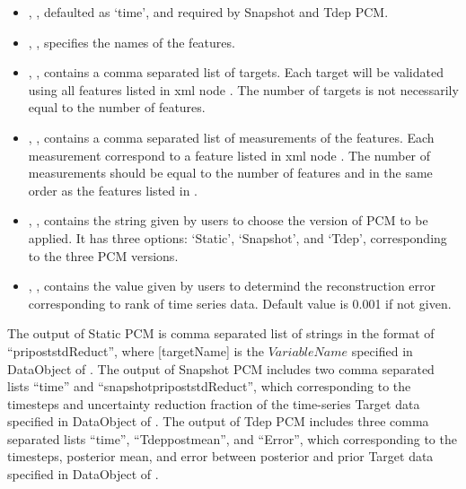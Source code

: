 \begin{itemize}
  \item {}, , defaulted as `time', and required by Snapshot and Tdep PCM.
  \item {}, , specifies the names of the features.
  \item {}, , contains a comma separated list of
     targets. \nb Each target will be validated using all features listed in xml node . The
    number of targets is not necessarily equal to the number of features.
  \item {}, , contains a comma separated list of
     measurements of the features. \nb Each measurement correspond to a feature listed in xml node . The
    number of measurements should be equal to the number of features and in the same order as the features listed in .
  \item {}, , contains the string given by users to choose the version
    of PCM to be applied. \nb It has three options: `Static', `Snapshot', and `Tdep', corresponding to the three PCM versions.
  \item {}, , contains the value given by users to determind the
    reconstruction error corresponding to rank of time series data. Default value is 0.001 if not given.
\end{itemize}

The output of Static PCM is comma separated list of strings in the format of ``pri\textunderscore post\textunderscore stdReduct\textunderscore [targetName]'',
where [targetName] is the $VariableName$ specified in DataObject of .
The output of Snapshot PCM includes two comma separated lists ``time'' and  ``snapshot\textunderscore pri\textunderscore post\textunderscore stdReduct'',
which corresponding to the timesteps and uncertainty reduction fraction of the time-series Target data specified in DataObject of .
The output of Tdep PCM includes three comma separated lists ``time'', ``Tdep\textunderscore post\textunderscore mean'', and ``Error'',
which corresponding to the timesteps, posterior mean, and error between posterior and prior Target data specified in DataObject of .

